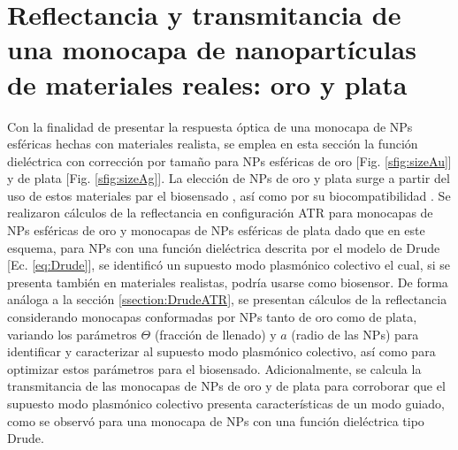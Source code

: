 \section{Reflectancia y transmitancia de una monocapa de nanopartículas de materiales reales: oro y plata}
\label{section:AuAg}

Con la finalidad de presentar la respuesta óptica de una monocapa de NPs esféricas hechas con materiales realista, se emplea en esta sección la función dieléctrica con corrección por tamaño para NPs esféricas de oro [Fig. \ref{sfig:sizeAu}] y de plata [Fig. \ref{sfig:sizeAg}]. La elección de NPs de oro y plata surge a partir del uso de estos materiales par el biosensado \cite{jain2008noble,estevez2014trends}, así como por su biocompatibilidad \cite{fan2009bio,bosetti2002silver}. Se realizaron cálculos de la reflectancia en configuración ATR para monocapas de NPs esféricas de oro y monocapas de NPs esféricas de plata dado que en este esquema, para NPs con una función dieléctrica descrita por el modelo de Drude [Ec. \eqref{eq:Drude}], se identificó un supuesto modo plasmónico colectivo el cual, si se presenta también en materiales realistas, podría usarse como biosensor. De forma análoga a la sección \ref{ssection:DrudeATR}, se presentan cálculos de la reflectancia  considerando monocapas conformadas por NPs tanto de oro como de plata, variando los parámetros $\Theta$ (fracción de llenado) y  $a$ (radio de las NPs) para identificar y caracterizar al supuesto modo plasmónico colectivo, así como para optimizar estos parámetros para el biosensado. Adicionalmente, se calcula la transmitancia de las monocapas de NPs de oro y de plata para corroborar que el supuesto modo plasmónico colectivo presenta características de un modo guiado, como se observó para una monocapa de NPs con una función dieléctrica tipo Drude.

